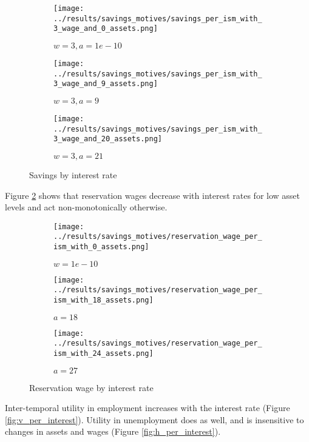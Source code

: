 \documentclass[12pt]{article}
\begin{document}
\begin{figure}[hbt!]

\begin{subfigure}{0.33\textwidth}
\texttt{[image: ../results/savings\_motives/savings\_per\_ism\_with\_3\_wage\_and\_0\_assets.png]} \caption{$w=3, a=1e-10$}
\end{subfigure}%
\begin{subfigure}{0.33\textwidth}
\texttt{[image: ../results/savings\_motives/savings\_per\_ism\_with\_3\_wage\_and\_9\_assets.png]}
\caption{$w=3, a=9$}
\end{subfigure}%
\begin{subfigure}{0.33\textwidth}
\texttt{[image: ../results/savings\_motives/savings\_per\_ism\_with\_3\_wage\_and\_20\_assets.png]}
\caption{$w=3, a=21$}
\end{subfigure}

\caption{Savings by interest rate}
\label{fig:savings_per_ism}
\end{figure}


\vspace{5mm}
Figure \ref{fig:reservation_wage_by_interest} shows that reservation wages decrease with interest rates for low asset levels and act non-monotonically otherwise.


\begin{figure}[hbt!]

\begin{subfigure}{0.33\textwidth}
\texttt{[image: ../results/savings\_motives/reservation\_wage\_per\_ism\_with\_0\_assets.png]} \caption{$w=1e-10$}
\end{subfigure}%
\begin{subfigure}{0.33\textwidth}
\texttt{[image: ../results/savings\_motives/reservation\_wage\_per\_ism\_with\_18\_assets.png]}
\caption{$a=18$}
\end{subfigure}%
\begin{subfigure}{0.33\textwidth}
\texttt{[image: ../results/savings\_motives/reservation\_wage\_per\_ism\_with\_24\_assets.png]}
\caption{$a=27$}
\end{subfigure}

\caption{Reservation wage by interest rate}
\label{fig:reservation_wage_by_interest}
\end{figure}

\vspace{5mm}
Inter-temporal utility in employment increases with the interest rate (Figure \ref{fig:v_per_interest}). Utility in unemployment does as well, and is insensitive to changes in assets and wages (Figure \ref{fig:h_per_interest}).
\end{document}
